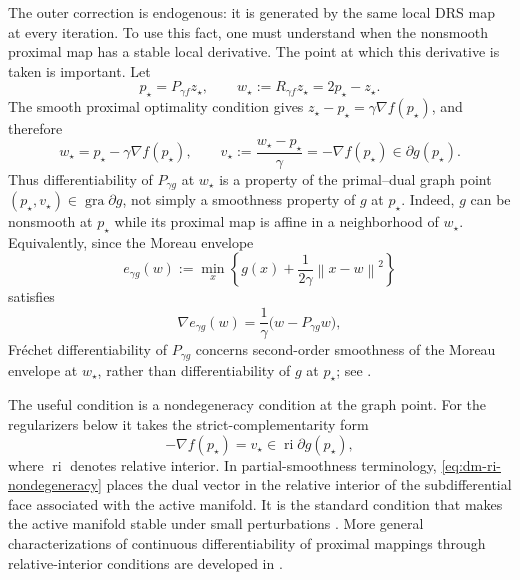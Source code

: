 \documentclass[10pt,leqno]{amsart}
\numberwithin{equation}{section}
\numberwithin{algorithm}{section}
\theoremstyle{remark}
\newcommand{\subd}{\partial}
\newcommand{\norm}[1]{\left\lVert #1 \right\rVert}
\newcommand{\grad}{\nabla}
\begin{document}
The outer correction is endogenous: it is generated by the same local DRS map at every iteration.  To use this fact, one must understand when the nonsmooth proximal map has a stable local derivative.  The point at which this derivative is taken is important.  Let
\begin{equation}
\label{eq:dm-prox-graph-point}
    p_\star=P_{\gamma f}z_\star,
    \qquad
    w_\star:=R_{\gamma f}z_\star=2p_\star-z_\star.
\end{equation}
The smooth proximal optimality condition gives
\(
 z_\star-p_\star=\gamma\grad f(p_\star)
\), and therefore
\begin{equation}
\label{eq:dm-wstar-primal-dual}
    w_\star=p_\star-\gamma\grad f(p_\star),
    \qquad
    v_\star:=\frac{w_\star-p_\star}{\gamma}
              =-\grad f(p_\star)
              \in\subd g(p_\star).
\end{equation}
Thus differentiability of \(P_{\gamma g}\) at \(w_\star\) is a property of the primal--dual graph point
\(
 (p_\star,v_\star)\in\operatorname{gra}\subd g
\), not simply a smoothness property of \(g\) at \(p_\star\).  Indeed, \(g\) can be nonsmooth at \(p_\star\) while its proximal map is affine in a neighborhood of \(w_\star\).  Equivalently, since the Moreau envelope
\[
    e_{\gamma g}(w)
      :=\min_x\left\{g(x)+\frac{1}{2\gamma}\norm{x-w}^2\right\}
\]
satisfies
\begin{equation}
\label{eq:dm-moreau-gradient}
    \grad e_{\gamma g}(w)
       =\frac{1}{\gamma}\bigl(w-P_{\gamma g}w\bigr),
\end{equation}
Fr\'echet differentiability of \(P_{\gamma g}\) concerns second-order smoothness of the Moreau envelope at \(w_\star\), rather than differentiability of \(g\) at \(p_\star\); see \cite[Chs.~12 and~24]{BauschkeCombettes2017}.

The useful condition is a nondegeneracy condition at the graph point.  For the regularizers below it takes the strict-complementarity form
\begin{equation}
\label{eq:dm-ri-nondegeneracy}
    -\grad f(p_\star)=v_\star
       \in\operatorname{ri}\subd g(p_\star),
\end{equation}
where \(\operatorname{ri}\) denotes relative interior.  In partial-smoothness terminology, \eqref{eq:dm-ri-nondegeneracy} places the dual vector in the relative interior of the subdifferential face associated with the active manifold.  It is the standard condition that makes the active manifold stable under small perturbations \cite{Lewis2002,LiangFadiliPeyre2017}.  More general characterizations of continuous differentiability of proximal mappings through relative-interior conditions are developed in \cite{HangSarabi2025}.
\end{document}
